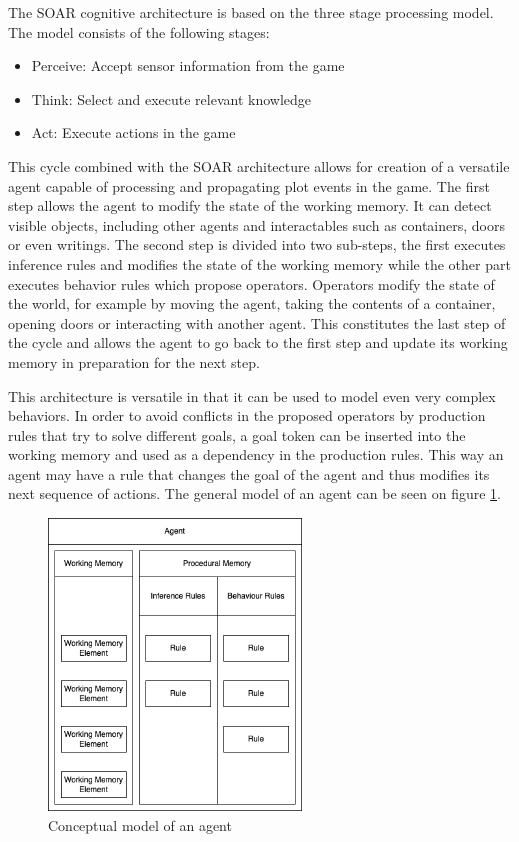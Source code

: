 \label{chapter:chapter1}

The SOAR cognitive architecture is based on the three stage processing model.
The model consists of the following stages:

\begin{itemize}
    \item Perceive: Accept sensor information from the game
    \item Think: Select and execute relevant knowledge
    \item Act: Execute actions in the game
\end{itemize}

This cycle combined with the SOAR architecture allows for creation of a versatile agent capable of processing and propagating plot events in the game.
The first step allows the agent to modify the state of the working memory.
It can detect visible objects, including other agents and interactables such as containers, doors or even writings.
The second step is divided into two sub-steps, the first executes inference rules and modifies the state of the working memory while the other part executes behavior rules which propose operators.
Operators modify the state of the world, for example by moving the agent, taking the contents of a container, opening doors or interacting with another agent.
This constitutes the last step of the cycle and allows the agent to go back to the first step and update its working memory in preparation for the next step.

This architecture is versatile in that it can be used to model even very complex behaviors.
In order to avoid conflicts in the proposed operators by production rules that try to solve different goals, a goal token can be inserted into the working memory and used as a dependency in the production rules.
This way an agent may have a rule that changes the goal of the agent and thus modifies its next sequence of actions.
The general model of an agent can be seen on figure \ref{fig:agent.drawio.png}.

\begin{figure}[H]
    \centering
    \includegraphics[width=0.6\textwidth]{images/chapter1/agent.drawio.png}
    \caption{Conceptual model of an agent}\label{fig:agent.drawio.png}
\end{figure}

